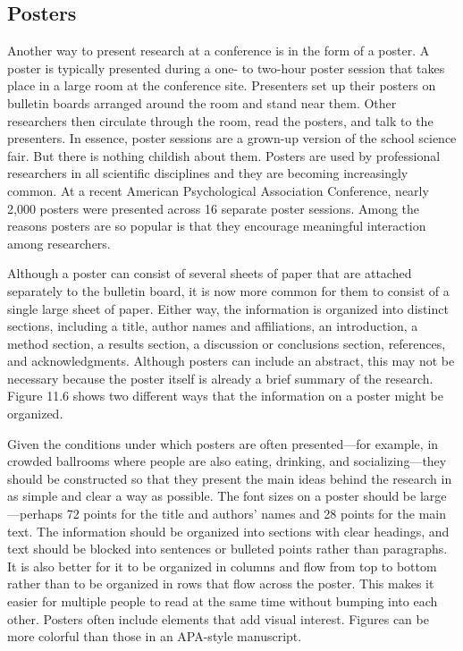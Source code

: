 \subsection{Posters}

Another way to present research at a conference is in the form of a poster. A poster is typically presented during a one- to two-hour poster session that takes place in a large room at the conference site. Presenters set up their posters on bulletin boards arranged around the room and stand near them. Other researchers then circulate through the room, read the posters, and talk to the presenters. In essence, poster sessions are a grown-up version of the school science fair. But there is nothing childish about them. Posters are used by professional researchers in all scientific disciplines and they are becoming increasingly common. At a recent American Psychological Association Conference, nearly 2,000 posters were presented across 16 separate poster sessions. Among the reasons posters are so popular is that they encourage meaningful interaction among researchers.


Although a poster can consist of several sheets of paper that are attached separately to the bulletin board, it is now more common for them to consist of a single large sheet of paper. Either way, the information is organized into distinct sections, including a title, author names and affiliations, an introduction, a method section, a results section, a discussion or conclusions section, references, and acknowledgments. Although posters can include an abstract, this may not be necessary because the poster itself is already a brief summary of the research. Figure 11.6 shows two different ways that the information on a poster might be organized.


Given the conditions under which posters are often presented---for example, in crowded ballrooms where people are also eating, drinking, and socializing---they should be constructed so that they present the main ideas behind the research in as simple and clear a way as possible. The font sizes on a poster should be large---perhaps 72 points for the title and authors' names and 28 points for the main text. The information should be organized into sections with clear headings, and text should be blocked into sentences or bulleted points rather than paragraphs. It is also better for it to be organized in columns and flow from top to bottom rather than to be organized in rows that flow across the poster. This makes it easier for multiple people to read at the same time without bumping into each other. Posters often include elements that add visual interest. Figures can be more colorful than those in an APA-style manuscript.


